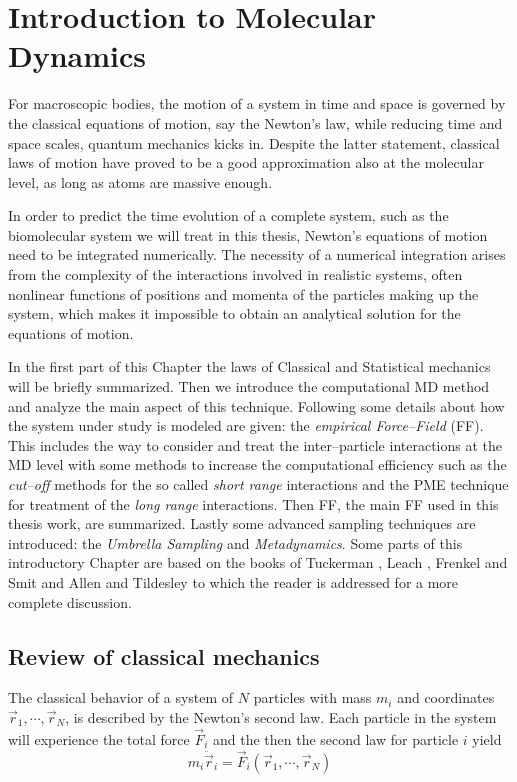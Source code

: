 \chapter{Introduction to Molecular Dynamics}
For macroscopic bodies, the motion of a system in time and space is governed by the classical equations of motion, say the Newton’s law, while reducing time and space scales, quantum mechanics kicks in. Despite the latter statement, classical laws of motion have proved to be a good approximation also at the molecular level, as long as atoms are massive enough.

In order to predict the time evolution of a complete system, such as the biomolecular system we will treat in this thesis, Newton’s equations of motion need to be integrated numerically. The necessity of a numerical integration arises from the complexity of the interactions involved in realistic systems, often nonlinear functions of positions and momenta of the particles making up the system, which makes it impossible to obtain an analytical solution for the equations of motion.

In the first part of this Chapter the laws of Classical and Statistical mechanics will be briefly summarized. Then we introduce the computational \acf{MD} method and analyze the main aspect of this technique. Following some details about how the system under study is modeled are given: the \textit{empirical Force--Field} (\acs{FF}). This includes the way to consider and treat the inter--particle interactions at the \ac{MD} level with some methods to increase the computational efficiency such as the \textit{cut--off} methods for the so called \textit{short range} interactions and the \ac{PME} technique for treatment of the \textit{long range} interactions. Then \martini \ac{FF}, the main \ac{FF} used in this thesis work, are summarized. Lastly some advanced sampling techniques are introduced: the \textit{Umbrella Sampling} and \textit{Metadynamics}. Some parts of this introductory Chapter are based on the books of Tuckerman \cite{Tuckerman}, Leach \cite{Leach}, Frenkel and Smit \cite{Frenkel} and Allen and Tildesley \cite{Allen} to which the reader is addressed for a more complete discussion.

\section{Review of classical mechanics}
The classical behavior of a system of $N$ particles with mass $m_i$ and coordinates $\vec r_1,\cdots,\vec r_N$, is described by the Newton's second law. Each particle in the system will experience the total force $\vec F_i$ and the then the second law for particle $i$ yield
\begin{equation}
	m_i \ddot{\vec{r}}_i = \vec F_i(\vec r_1,\cdots,\vec r_N)
	\label{eq:newtonLaw}
\end{equation}

